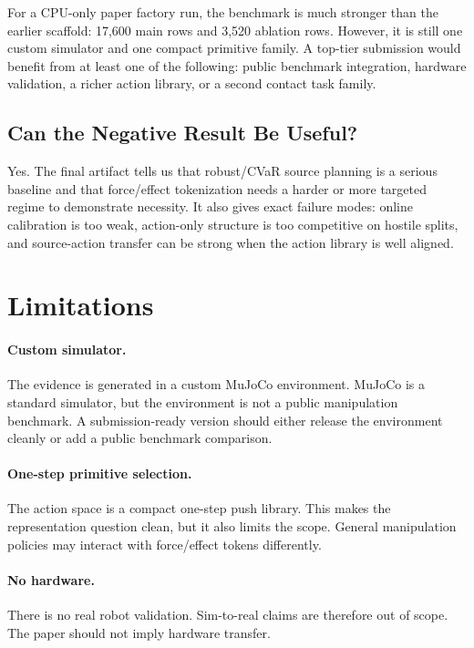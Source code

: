 \documentclass{article}
\begin{document}
For a CPU-only paper factory run, the benchmark is much stronger than the earlier scaffold: 17,600 main rows and 3,520 ablation rows. However, it is still one custom simulator and one compact primitive family. A top-tier submission would benefit from at least one of the following: public benchmark integration, hardware validation, a richer action library, or a second contact task family.

\subsection{Can the Negative Result Be Useful?}

Yes. The final artifact tells us that robust/CVaR source planning is a serious baseline and that force/effect tokenization needs a harder or more targeted regime to demonstrate necessity. It also gives exact failure modes: online calibration is too weak, action-only structure is too competitive on hostile splits, and source-action transfer can be strong when the action library is well aligned.

\section{Limitations}

\paragraph{Custom simulator.}
The evidence is generated in a custom MuJoCo environment. MuJoCo is a standard simulator, but the environment is not a public manipulation benchmark. A submission-ready version should either release the environment cleanly or add a public benchmark comparison.

\paragraph{One-step primitive selection.}
The action space is a compact one-step push library. This makes the representation question clean, but it also limits the scope. General manipulation policies may interact with force/effect tokens differently.

\paragraph{No hardware.}
There is no real robot validation. Sim-to-real claims are therefore out of scope. The paper should not imply hardware transfer.
\end{document}
